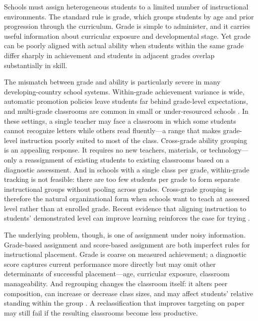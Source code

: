 \documentclass[11pt]{article}
\begin{document}
Schools must assign heterogeneous students to a limited number of instructional environments. The standard rule is grade, which groups students by age and prior progression through the curriculum. Grade is simple to administer, and it carries useful information about curricular exposure and developmental stage. Yet grade can be poorly aligned with actual ability when students within the same grade differ sharply in achievement and students in adjacent grades overlap substantially in skill.

The mismatch between grade and ability is particularly severe in many developing-country school systems. Within-grade achievement variance is wide, automatic promotion policies leave students far behind grade-level expectations, and multi-grade classrooms are common in small or under-resourced schools \citep{banerjee/cole/duflo/linden:2007,muralidharan2019disrupting}. In these settings, a single teacher may face a classroom in which some students cannot recognize letters while others read fluently---a range that makes grade-level instruction poorly suited to most of the class. Cross-grade ability grouping is an appealing response. It requires no new teachers, materials, or technology---only a reassignment of existing students to existing classrooms based on a diagnostic assessment. And in schools with a single class per grade, within-grade tracking is not feasible: there are too few students per grade to form separate instructional groups without pooling across grades. Cross-grade grouping is therefore the natural organizational form when schools want to teach at assessed level rather than at enrolled grade. Recent evidence that aligning instruction to students' demonstrated level can improve learning reinforces the case for trying \citep{banerjee2017proof,duflo2020experimental}.

The underlying problem, though, is one of assignment under noisy information. Grade-based assignment and score-based assignment are both imperfect rules for instructional placement. Grade is coarse on measured achievement; a diagnostic score captures current performance more directly but may omit other determinants of successful placement---age, curricular exposure, classroom manageability. And regrouping changes the classroom itself: it alters peer composition, can increase or decrease class sizes, and may affect students' relative standing within the group \citep{betts:2011}. A reclassification that improves targeting on paper may still fail if the resulting classrooms become less productive.
\end{document}
